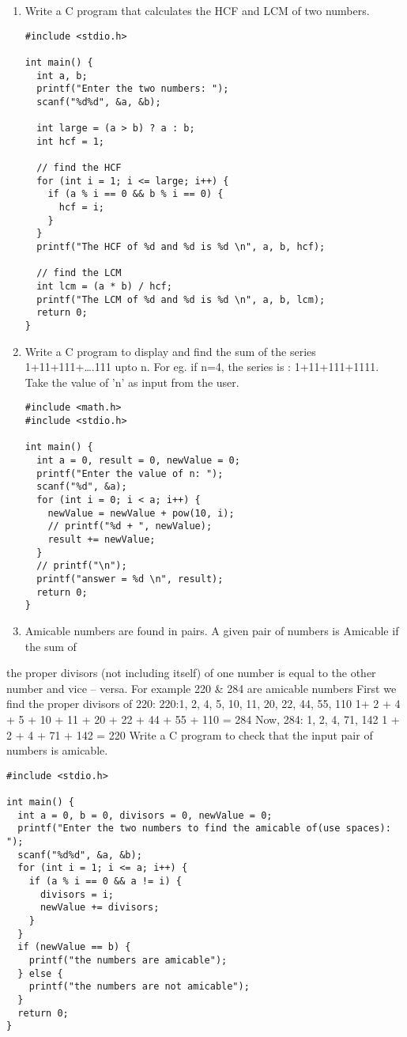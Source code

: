 \documentclass[11pt]{article}
\begin{document}
\begin{enumerate}
\item Write a C program that calculates the HCF and LCM of two numbers.

\begin{verbatim}
#include <stdio.h>

int main() {
  int a, b;
  printf("Enter the two numbers: ");
  scanf("%d%d", &a, &b);

  int large = (a > b) ? a : b;
  int hcf = 1;

  // find the HCF
  for (int i = 1; i <= large; i++) {
    if (a % i == 0 && b % i == 0) {
      hcf = i;
    }
  }
  printf("The HCF of %d and %d is %d \n", a, b, hcf);

  // find the LCM
  int lcm = (a * b) / hcf;
  printf("The LCM of %d and %d is %d \n", a, b, lcm);
  return 0;
}
\end{verbatim}

\item Write a C program to display and find the sum of the series 1+11+111+\ldots{}.111 upto n. For eg. if n=4, the series is : 1+11+111+1111. Take the value of 'n' as input from the user.

\begin{verbatim}
#include <math.h>
#include <stdio.h>

int main() {
  int a = 0, result = 0, newValue = 0;
  printf("Enter the value of n: ");
  scanf("%d", &a);
  for (int i = 0; i < a; i++) {
    newValue = newValue + pow(10, i);
    // printf("%d + ", newValue);
    result += newValue;
  }
  // printf("\n");
  printf("answer = %d \n", result);
  return 0;
}
\end{verbatim}

\item Amicable numbers are found in pairs. A given pair of numbers is Amicable if the sum of
\end{enumerate}
the proper divisors (not including itself) of one number is equal to the other number and
vice – versa. For example 220 \& 284 are amicable numbers
First we find the proper divisors of 220:
220:1, 2, 4, 5, 10, 11, 20, 22, 44, 55, 110
1+ 2 + 4 + 5 + 10 + 11 + 20 + 22 + 44 + 55 + 110 = 284
Now, 284: 1, 2, 4, 71, 142
1 + 2 + 4 + 71 + 142 = 220
Write a C program to check that the input pair of numbers is amicable.

\begin{verbatim}
#include <stdio.h>

int main() {
  int a = 0, b = 0, divisors = 0, newValue = 0;
  printf("Enter the two numbers to find the amicable of(use spaces): ");
  scanf("%d%d", &a, &b);
  for (int i = 1; i <= a; i++) {
    if (a % i == 0 && a != i) {
      divisors = i;
      newValue += divisors;
    }
  }
  if (newValue == b) {
    printf("the numbers are amicable");
  } else {
    printf("the numbers are not amicable");
  }
  return 0;
}
\end{verbatim}
\end{document}
